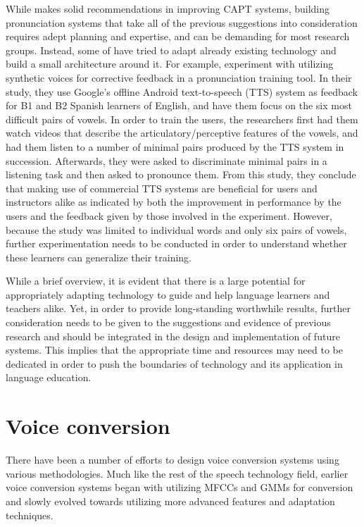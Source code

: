 \documentclass
[
    a4paper,
    twoside,
    12pt,
]
{report}
\begin{document}
While \textcite{neri2002} makes solid recommendations in improving CAPT
systems, building pronunciation systems that take all of the previous
suggestions into consideration requires adept planning and expertise,
and can be demanding for most research groups. Instead, some of have
tried to adapt already existing technology and build a small
architecture around it. For example, \parencite{tejedor-garcia2017}
experiment with utilizing synthetic voices for corrective feedback in a
pronunciation training tool. In their study, they use Google's offline
Android text-to-speech (TTS) system as feedback for B1 and B2 Spanish
learners of English, and have them focus on the six most difficult pairs
of vowels. In order to train the users, the researchers first had them
watch videos that describe the articulatory/perceptive features of the
vowels, and had them listen to a number of minimal pairs produced by the
TTS system in succession. Afterwards, they were asked to discriminate
minimal pairs in a listening task and then asked to pronounce them. From
this study, they conclude that making use of commercial TTS systems are
beneficial for users and instructors alike as indicated by both the
improvement in performance by the users and the feedback given by those
involved in the experiment. However, because the study was limited to
individual words and only six pairs of vowels, further experimentation
needs to be conducted in order to understand whether these learners can
generalize their training.

While a brief overview, it is evident that there is a large potential
for appropriately adapting technology to guide and help language
learners and teachers alike. Yet, in order to provide long-standing
worthwhile results, further consideration needs to be given to the
suggestions and evidence of previous research and should be integrated
in the design and implementation of future systems. This implies that
the appropriate time and resources may need to be dedicated in order to
push the boundaries of technology and its application in language
education.

\hypertarget{voice-conversion}{%
\section{Voice conversion}\label{voice-conversion}}

There have been a number of efforts to design voice conversion systems
using various methodologies. Much like the rest of the speech technology
field, earlier voice conversion systems began with utilizing MFCCs and
GMMs for conversion and slowly evolved towards utilizing more advanced
features and adaptation techniques.
\end{document}

